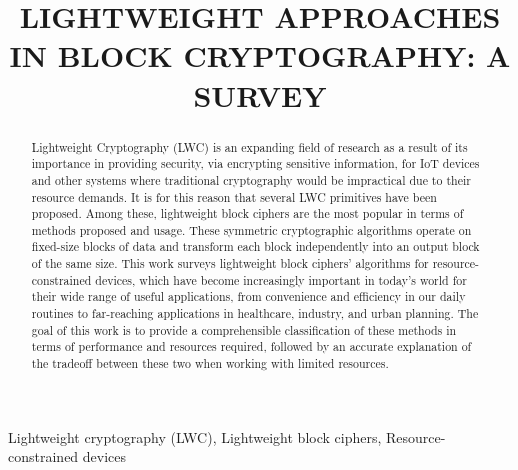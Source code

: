 \documentclass[conference,compsoc]{IEEEtran}
\begin{document}
\title{LIGHTWEIGHT APPROACHES IN BLOCK CRYPTOGRAPHY: A SURVEY}

\author{
}

\maketitle
\begin{abstract}
Lightweight Cryptography (LWC) is an expanding field of research as a result of its importance in providing security, via encrypting sensitive information, for IoT devices and other systems where traditional cryptography would be impractical due to their resource demands. It is for this reason that several LWC primitives have been proposed. Among these, lightweight block ciphers are the most popular in terms of methods proposed and usage. These symmetric cryptographic algorithms operate on fixed-size blocks of data and transform each block independently into an output block of the same size. This work surveys lightweight block ciphers' algorithms for resource-constrained devices, which have become increasingly important in today's world for their wide range of useful applications, from convenience and efficiency in our daily routines to far-reaching applications in healthcare, industry, and urban planning. The goal of this work is to provide a comprehensible classification of these methods in terms of performance and resources required, followed by an accurate explanation of the tradeoff between these two when working with limited resources.
\end{abstract}

\begin{IEEEkeywords} Lightweight cryptography (LWC), Lightweight block ciphers, Resource-constrained devices \end{IEEEkeywords}
\end{document}
